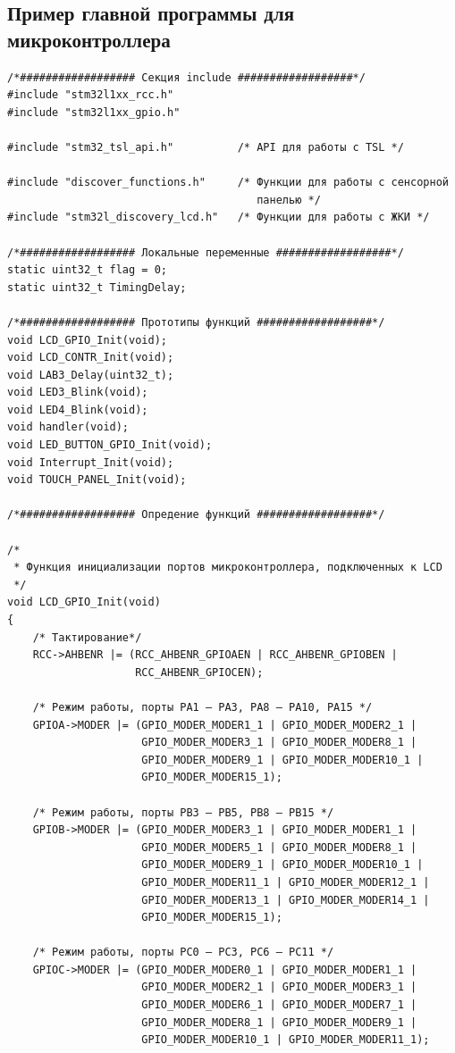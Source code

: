 \subsection{Пример главной программы для микроконтроллера}
\begin{verbatim}
/*################## Секция include ##################*/
#include "stm32l1xx_rcc.h"
#include "stm32l1xx_gpio.h"

#include "stm32_tsl_api.h"          /* API для работы с TSL */

#include "discover_functions.h"     /* Функции для работы с сенсорной 
                                       панелью */
#include "stm32l_discovery_lcd.h"   /* Функции для работы с ЖКИ */

/*################## Локальные переменные ##################*/
static uint32_t flag = 0;
static uint32_t TimingDelay;

/*################## Прототипы функций ##################*/
void LCD_GPIO_Init(void);
void LCD_CONTR_Init(void);
void LAB3_Delay(uint32_t);
void LED3_Blink(void);
void LED4_Blink(void);
void handler(void);
void LED_BUTTON_GPIO_Init(void);
void Interrupt_Init(void);
void TOUCH_PANEL_Init(void);

/*################## Опредение функций ##################*/

/*
 * Функция инициализации портов микроконтроллера, подключенных к LCD
 */
void LCD_GPIO_Init(void)
{
    /* Тактирование*/
    RCC->AHBENR |= (RCC_AHBENR_GPIOAEN | RCC_AHBENR_GPIOBEN | 
                    RCC_AHBENR_GPIOCEN);
    
    /* Режим работы, порты PA1 – PA3, PA8 – PA10, PA15 */
    GPIOA->MODER |= (GPIO_MODER_MODER1_1 | GPIO_MODER_MODER2_1 | 
                     GPIO_MODER_MODER3_1 | GPIO_MODER_MODER8_1 | 
                     GPIO_MODER_MODER9_1 | GPIO_MODER_MODER10_1 | 
                     GPIO_MODER_MODER15_1); 
    
    /* Режим работы, порты PB3 – PB5, PB8 – PB15 */
    GPIOB->MODER |= (GPIO_MODER_MODER3_1 | GPIO_MODER_MODER1_1 | 
                     GPIO_MODER_MODER5_1 | GPIO_MODER_MODER8_1 | 
                     GPIO_MODER_MODER9_1 | GPIO_MODER_MODER10_1 | 
                     GPIO_MODER_MODER11_1 | GPIO_MODER_MODER12_1 |
                     GPIO_MODER_MODER13_1 | GPIO_MODER_MODER14_1 | 
                     GPIO_MODER_MODER15_1); 
    
    /* Режим работы, порты PC0 – PC3, PC6 – PC11 */
    GPIOC->MODER |= (GPIO_MODER_MODER0_1 | GPIO_MODER_MODER1_1 | 
                     GPIO_MODER_MODER2_1 | GPIO_MODER_MODER3_1 |
                     GPIO_MODER_MODER6_1 | GPIO_MODER_MODER7_1 | 
                     GPIO_MODER_MODER8_1 | GPIO_MODER_MODER9_1 |  
                     GPIO_MODER_MODER10_1 | GPIO_MODER_MODER11_1); 
    

\end{verbatim}
